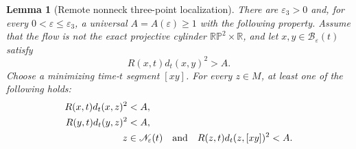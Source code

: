 \documentclass[10pt]{coll-l}
\newcommand{\R}{\mathbb{R}}
\newtheorem{lemma}[theorem]{Lemma}
\theoremstyle{definition}
\theoremstyle{remark}
\numberwithin{section}{chapter}
\numberwithin{equation}{chapter}
\begin{document}
\begin{lemma}[Remote nonneck three-point localization]
\label{lem:ncs-remote-three-point}
There are $\varepsilon_3>0$ and, for every
$0<\varepsilon\leq\varepsilon_3$, a universal $A=A(\varepsilon)\geq1$
with the following property.  Assume that the flow is not the exact
projective cylinder $\mathbb{RP}^2\times\R$, and let
$x,y\in\mathscr B_\varepsilon(t)$ satisfy
\begin{equation}
                  R(x,t)d_t(x,y)^2>A.                 \label{eq:ncs-remote-pair}
\end{equation}
Choose a minimizing time-$t$ segment $[xy]$.  For every $z\in M$, at least
one of the following holds:
\begin{align}
 R(x,t)d_t(x,z)^2&<A,                                  \label{eq:ncs-three-point-x}\\
 R(y,t)d_t(y,z)^2&<A,                                  \label{eq:ncs-three-point-y}\\
 z&\in\mathscr N_\varepsilon(t)\quad\hbox{and}\quad
 R(z,t)d_t(z,[xy])^2<A.                               \label{eq:ncs-three-point-middle}
\end{align}
\end{lemma}
\end{document}
